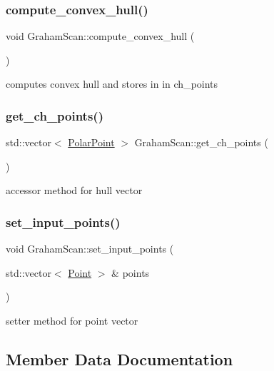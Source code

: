 \subsubsection{\texorpdfstring{compute\_convex\_hull()}{compute\_convex\_hull()}}
{\footnotesize\ttfamily void Graham\+Scan\+::compute\+\_\+convex\+\_\+hull (\begin{DoxyParamCaption}{ }\end{DoxyParamCaption})}

computes convex hull and stores in in ch\+\_\+points \mbox{\label{class_graham_scan_af42f09a4283ae9821917e13322be4b49}} 
\subsubsection{\texorpdfstring{get\_ch\_points()}{get\_ch\_points()}}
{\footnotesize\ttfamily std\+::vector$<$ \mbox{\hyperlink{class_polar_point}{Polar\+Point}} $>$ Graham\+Scan\+::get\+\_\+ch\+\_\+points (\begin{DoxyParamCaption}{ }\end{DoxyParamCaption})}

accessor method for hull vector \mbox{\label{class_graham_scan_a4e22ff4e4ee0cb57ae30bd06fd39871b}} 
\subsubsection{\texorpdfstring{set\_input\_points()}{set\_input\_points()}}
{\footnotesize\ttfamily void Graham\+Scan\+::set\+\_\+input\+\_\+points (\begin{DoxyParamCaption}\item[{std\+::vector$<$ \mbox{\hyperlink{class_point}{Point}} $>$ \&}]{points }\end{DoxyParamCaption})}

setter method for point vector 

\subsection{Member Data Documentation}
\mbox{\label{class_graham_scan_a3c5dda4a0c904b22a179511cc1d879ce}} 
